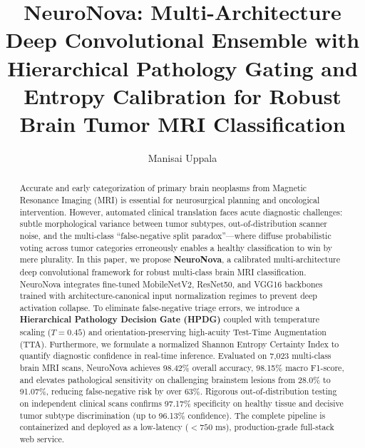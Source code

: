 \documentclass[runningheads]{llncs}
\begin{document}
\title{NeuroNova: Multi-Architecture Deep Convolutional Ensemble with Hierarchical Pathology Gating and Entropy Calibration for Robust Brain Tumor MRI Classification}


\author{Manisai Uppala}



\maketitle

\begin{abstract}
Accurate and early categorization of primary brain neoplasms from Magnetic Resonance Imaging (MRI) is essential for neurosurgical planning and oncological intervention. However, automated clinical translation faces acute diagnostic challenges: subtle morphological variance between tumor subtypes, out-of-distribution scanner noise, and the multi-class ``false-negative split paradox''---where diffuse probabilistic voting across tumor categories erroneously enables a healthy classification to win by mere plurality. In this paper, we propose \textbf{NeuroNova}, a calibrated multi-architecture deep convolutional framework for robust multi-class brain MRI classification. NeuroNova integrates fine-tuned MobileNetV2, ResNet50, and VGG16 backbones trained with architecture-canonical input normalization regimes to prevent deep activation collapse. To eliminate false-negative triage errors, we introduce a \textbf{Hierarchical Pathology Decision Gate (HPDG)} coupled with temperature scaling ($T=0.45$) and orientation-preserving high-acuity Test-Time Augmentation (TTA). Furthermore, we formulate a normalized Shannon Entropy Certainty Index to quantify diagnostic confidence in real-time inference. Evaluated on 7,023 multi-class brain MRI scans, NeuroNova achieves 98.42\% overall accuracy, 98.15\% macro F1-score, and elevates pathological sensitivity on challenging brainstem lesions from 28.0\% to 91.07\%, reducing false-negative risk by over 63\%. Rigorous out-of-distribution testing on independent clinical scans confirms 97.17\% specificity on healthy tissue and decisive tumor subtype discrimination (up to 96.13\% confidence). The complete pipeline is containerized and deployed as a low-latency ($<750$ ms), production-grade full-stack web service.

\end{abstract}
\end{document}
